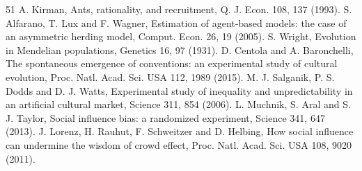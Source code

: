 \documentclass[11pt]{article}
\begin{document}
\begin{thebibliography}{51}
 A. Kirman, Ants, rationality, and recruitment, Q. J. Econ. 108, 137 (1993).
 S. Alfarano, T. Lux and F. Wagner, Estimation of agent-based models: the case of an asymmetric herding model, Comput. Econ. 26, 19 (2005).
 S. Wright, Evolution in Mendelian populations, Genetics 16, 97 (1931).
 D. Centola and A. Baronchelli, The spontaneous emergence of conventions: an experimental study of cultural evolution, Proc. Natl. Acad. Sci. USA 112, 1989 (2015).
 M. J. Salganik, P. S. Dodds and D. J. Watts, Experimental study of inequality and unpredictability in an artificial cultural market, Science 311, 854 (2006).
 L. Muchnik, S. Aral and S. J. Taylor, Social influence bias: a randomized experiment, Science 341, 647 (2013).
 J. Lorenz, H. Rauhut, F. Schweitzer and D. Helbing, How social influence can undermine the wisdom of crowd effect, Proc. Natl. Acad. Sci. USA 108, 9020 (2011).
\end{thebibliography}
\end{document}
